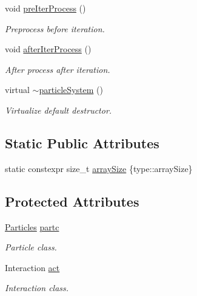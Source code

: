 \begin{DoxyCompactItemize}
void \mbox{\hyperlink{classparticle_system_a14ee76644ab1bacc3ed4a66e4fff0fb1}{pre\+Iter\+Process}} ()
\begin{DoxyCompactList}\small\item\em Preprocess before iteration. \end{DoxyCompactList}\item 
void \mbox{\hyperlink{classparticle_system_a12fa297e1f6674847c2b90761f30d336}{after\+Iter\+Process}} ()
\begin{DoxyCompactList}\small\item\em After process after iteration. \end{DoxyCompactList}\item 
virtual \mbox{\hyperlink{classparticle_system_a56d066b7151be7bdb05f64349d44581e}{$\sim$particle\+System}} ()
\begin{DoxyCompactList}\small\item\em Virtualize default destructor. \end{DoxyCompactList}\end{DoxyCompactItemize}
\subsection*{Static Public Attributes}
\begin{DoxyCompactItemize}
\item 
static constexpr size\+\_\+t \mbox{\hyperlink{classparticle_system_a546e31d7390df18688216898c6f610f9}{array\+Size}} \{type\+::array\+Size\}
\end{DoxyCompactItemize}
\subsection*{Protected Attributes}
\begin{DoxyCompactItemize}
\item 
\mbox{\hyperlink{struct_particles}{Particles}} \mbox{\hyperlink{classparticle_system_a48cb24fbd9d72503a5e464a02760e814}{partc}}
\begin{DoxyCompactList}\small\item\em Particle class. \end{DoxyCompactList}\item 
Interaction \mbox{\hyperlink{classparticle_system_a41e5c73bc46164302db25b5c5d28aedd}{act}}
\begin{DoxyCompactList}\small\item\em Interaction class. \end{DoxyCompactList}\end{DoxyCompactItemize}
